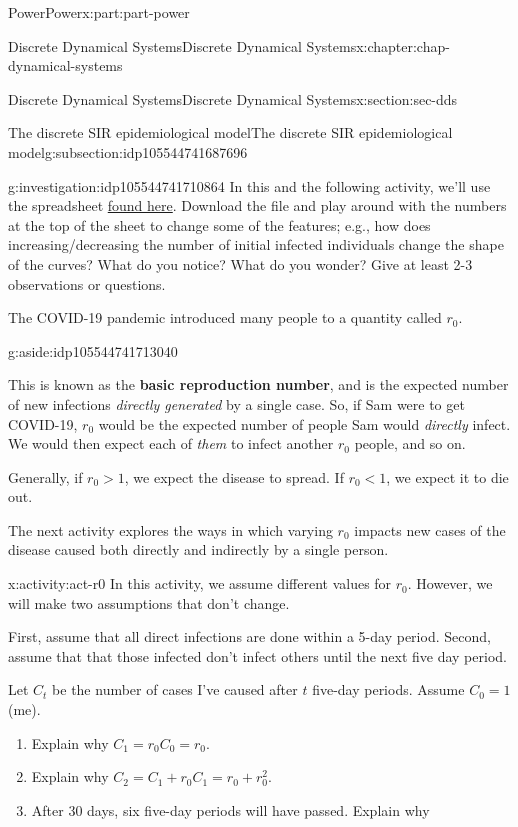 \documentclass[oneside,10pt,]{book}
\newcommand{\terminology}[1]{\textbf{#1}}
\numberwithin{equation}{section}
\newcommand{\lt}{<}
\newcommand{\gt}{>}
\begin{document}
\begin{partptx}{Power}{}{Power}{}{}{x:part:part-power}
\begin{chapterptx}{Discrete Dynamical Systems}{}{Discrete Dynamical Systems}{}{}{x:chapter:chap-dynamical-systems}
\begin{sectionptx}{Discrete Dynamical Systems}{}{Discrete Dynamical Systems}{}{}{x:section:sec-dds}
\begin{subsectionptx}{The discrete SIR epidemiological model}{}{The discrete SIR epidemiological model}{}{}{g:subsection:idp105544741687696}
\begin{investigation}{}{g:investigation:idp105544741710864}
In this and the following activity, we'll use the spreadsheet \href{https://docs.google.com/spreadsheets/d/153LO2O21_TwEYyODq2Km90oRrilLEpfYmgb8w3AJSQo/edit?usp=sharing}{found here}\footnotemark{}. Download the file and play around with the numbers at the top of the sheet to change some of the features; e.g., how does increasing\slash{}decreasing the number of initial infected individuals change the shape of the curves? What do you notice? What do you wonder? Give at least 2-3 observations or questions.%
\end{investigation}%
%
The COVID-19 pandemic introduced many people to a quantity called \(r_0\). \begin{aside}{}{g:aside:idp105544741713040}%
\end{aside}
 This is known as the \terminology{basic reproduction number}, and is the expected number of new infections \emph{directly generated} by a single case. So, if Sam were to get COVID-19, \(r_0\) would be the expected number of people Sam would \emph{directly} infect. We would then expect each of \emph{them} to infect another \(r_0\) people, and so on.%
\par
Generally, if \(r_0 \gt 1\), we expect the disease to spread. If \(r_0 \lt 1\), we expect it to die out.%
\par
The next activity explores the ways in which varying \(r_0\) impacts new cases of the disease caused both directly and indirectly by a single person.%
\begin{activity}{}{x:activity:act-r0}%
In this activity, we assume different values for \(r_0\). However, we will make two assumptions that don't change.%
\par
First, assume that all direct infections are done within a 5-day period. Second, assume that that those infected don't infect others until the next five day period.%
\par
Let \(C_t\) be the number of cases I've caused after \(t\) five-day periods. Assume \(C_0 = 1\) (me).%
%
\begin{enumerate}
\item{}Explain why \(C_1 = r_0 C_0 = r_0\).%
\item{}Explain why \(C_2 = C_1 + r_0 C_1 = r_0 + r_0^2\).%
\item{}After 30 days, six five-day periods will have passed. Explain why%
\begin{equation*}

\end{equation*}
\end{enumerate}
\end{activity}
\end{subsectionptx}
\end{sectionptx}
\end{chapterptx}
\end{partptx}
\end{document}
